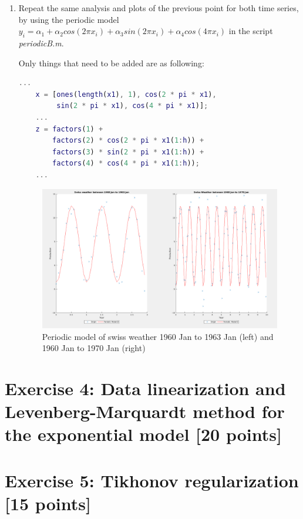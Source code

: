 \documentclass[unicode,11pt,a4paper,oneside,numbers=endperiod,openany]{scrartcl}
\begin{document}
\begin{enumerate}[label=(\alph*)]
\newpage

\item Repeat the same analysis and plots of the previous point for both time series, by using the periodic model
${y_i = \alpha_1 + \alpha_2 cos(2\pi x_i ) + \alpha_3 sin(2\pi x_i ) + \alpha_4 cos(4\pi x_i)}$ in the script \textit{periodicB.m}.

Only things that need to be added are as following:

\begin{lstlisting}[language=Matlab]
    ...
    x = [ones(length(x1), 1), cos(2 * pi * x1), 
         sin(2 * pi * x1), cos(4 * pi * x1)];
    ...
    z = factors(1) + 
        factors(2) * cos(2 * pi * x1(1:h)) + 
        factors(3) * sin(2 * pi * x1(1:h)) +
        factors(4) * cos(4 * pi * x1(1:h));
    ...
\end{lstlisting}

 \begin{figure}[h!]
    \begin{minipage}[c]{1\linewidth}
        \centering
        \includegraphics[width=0.9\linewidth]{./figures/ex3b.png}
    \end{minipage}
  \caption{Periodic model of swiss weather 1960 Jan to 1963 Jan (left) and 1960 Jan to 1970 Jan (right)}
\end{figure}
\end{enumerate}

\section*{Exercise 4: Data linearization and Levenberg-Marquardt method for the exponential model [20 points]}

\section*{Exercise 5: Tikhonov regularization [15 points]}
\end{document}
